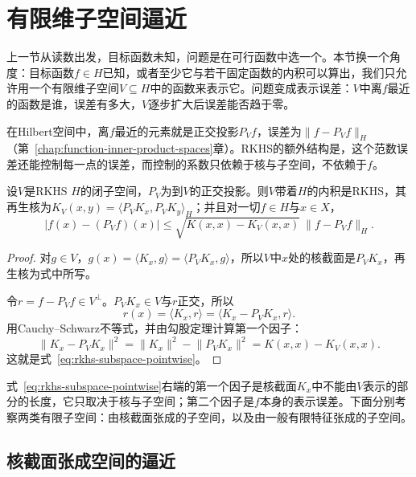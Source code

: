 \section{有限维子空间逼近}
\label{sec:rkhs-finite-subspaces}

上一节从读数出发，目标函数未知，问题是在可行函数中选一个。本节换一个角度：目标函数$f\in H$已知，或者至少它与若干固定函数的内积可以算出，我们只允许用一个有限维子空间$V\subseteq H$中的函数来表示它。问题变成表示误差：$V$中离$f$最近的函数是谁，误差有多大，$V$逐步扩大后误差能否趋于零。

在Hilbert空间中，离$f$最近的元素就是正交投影$P_Vf$，误差为$\lVert f-P_Vf\rVert_H$（第~\ref{chap:function-inner-product-spaces}章）。RKHS的额外结构是，这个范数误差还能控制每一点的误差，而控制的系数只依赖于核与子空间，不依赖于$f$。

\begin{theorem}[子空间的再生核与逐点误差]
\label{thm:rkhs-subspace-error}
设$V$是RKHS $H$的闭子空间，$P_V$为到$V$的正交投影。则$V$带着$H$的内积是RKHS，其再生核为$K_V(x,y)=\langle P_VK_x,P_VK_y\rangle_H$；并且对一切$f\in H$与$x\in X$，
\begin{equation}
\lvert f(x)-(P_Vf)(x)\rvert\leq\sqrt{K(x,x)-K_V(x,x)}\ \lVert f-P_Vf\rVert_H .
\label{eq:rkhs-subspace-pointwise}
\end{equation}
\end{theorem}

\begin{proof}
对$g\in V$，$g(x)=\langle K_x,g\rangle=\langle P_VK_x,g\rangle$，所以$V$中$x$处的核截面是$P_VK_x$，再生核为式中所写。

令$r=f-P_Vf\in V^\perp$。$P_VK_x\in V$与$r$正交，所以
\[
r(x)=\langle K_x,r\rangle=\langle K_x-P_VK_x,r\rangle .
\]
用Cauchy--Schwarz不等式，并由勾股定理计算第一个因子：
\[
\lVert K_x-P_VK_x\rVert^2=\lVert K_x\rVert^2-\lVert P_VK_x\rVert^2=K(x,x)-K_V(x,x).
\]
这就是式~\eqref{eq:rkhs-subspace-pointwise}。
\end{proof}

式~\eqref{eq:rkhs-subspace-pointwise}右端的第一个因子是核截面$K_x$中不能由$V$表示的部分的长度，它只取决于核与子空间；第二个因子是$f$本身的表示误差。下面分别考察两类有限子空间：由核截面张成的子空间，以及由一般有限特征张成的子空间。

\subsection{核截面张成空间的逼近}
\label{sec:rkhs-section-span-approx}

